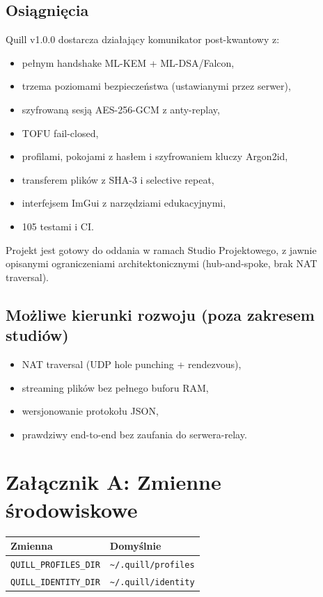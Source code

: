 \documentclass[12pt,a4paper]{article}
\begin{document}
\subsection{Osiągnięcia}

Quill v1.0.0 dostarcza działający komunikator post-kwantowy z:
\begin{itemize}
    \item pełnym handshake ML-KEM + ML-DSA/Falcon,
    \item trzema poziomami bezpieczeństwa (ustawianymi przez serwer),
    \item szyfrowaną sesją AES-256-GCM z anty-replay,
    \item TOFU fail-closed,
    \item profilami, pokojami z hasłem i szyfrowaniem kluczy Argon2id,
    \item transferem plików z SHA-3 i selective repeat,
    \item interfejsem ImGui z narzędziami edukacyjnymi,
    \item 105 testami i CI.
\end{itemize}

Projekt jest gotowy do oddania w ramach Studio Projektowego, z jawnie opisanymi ograniczeniami architektonicznymi (hub-and-spoke, brak NAT traversal).

\subsection{Możliwe kierunki rozwoju (poza zakresem studiów)}

\begin{itemize}
    \item NAT traversal (UDP hole punching + rendezvous),
    \item streaming plików bez pełnego buforu RAM,
    \item wersjonowanie protokołu JSON,
    \item prawdziwy end-to-end bez zaufania do serwera-relay.
\end{itemize}

\appendix
\section{Załącznik A: Zmienne środowiskowe}

\begin{table}[H]
\centering
\begin{tabular}{@{}ll@{}}
\toprule
\textbf{Zmienna} & \textbf{Domyślnie} \\
\midrule
\texttt{QUILL\_PROFILES\_DIR} & \texttt{\textasciitilde/.quill/profiles} \\
\texttt{QUILL\_IDENTITY\_DIR} & \texttt{\textasciitilde/.quill/identity} \\
\bottomrule
\end{tabular}
\end{table}
\end{document}
